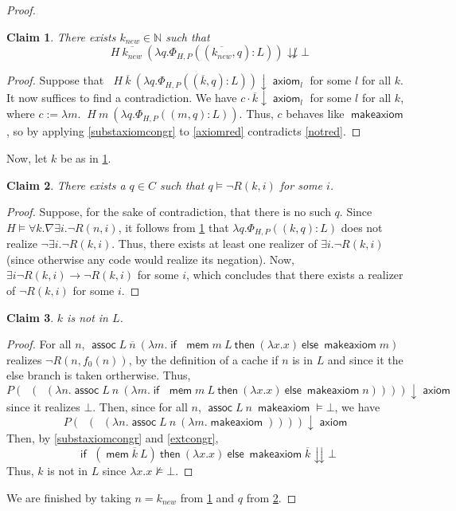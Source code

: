 \documentclass{article}
\newtheorem{claim}{Claim}
\DeclareMathOperator{\makeaxiom}{\mathsf{makeaxiom}}
\DeclareMathOperator{\axiom}{\mathsf{axiom}}
\DeclareMathOperator{\assoc}{\mathsf{assoc}}
\DeclareMathOperator{\mem}{\mathsf{mem}}
\DeclareMathOperator{\iif}{\mathsf{if}\ }
\newcommand{\tthen}{\mathbin{\ \mathsf{then}}\ }
\newcommand{\eelse}{\mathbin{\ \mathsf{else}}\ }
\DeclareMathOperator{\introexists}{\mathsf{intro}_\exists}
\DeclareMathOperator{\introforall}{\mathsf{intro}_\forall}
\DeclareMathOperator{\elimexists}{\mathsf{elim}_\exists}
\DeclareMathOperator{\elimforall}{\mathsf{elim}_\forall}
\newcommand{\N}{\mathbb{N}}
\begin{document}
\begin{proof}
    \begin{claim}\label{new}
        There exists $k_{new} \in \N$ such that
        \[ \elimforall H\ \overline{k_{new}}\ (\lambda q. \Phi_{H, P} ((\overline{k_{new}}, q):L)) \not\downdownarrows \bot \]
    \end{claim}
    \begin{proof}
        Suppose that $ \elimforall H\ \overline{k}\ (\lambda q. \Phi_{H, P} ((\overline{k}, q):L)) \downarrow \axiom_l$ for some $l$ for all $k$.
        It now suffices to find a contradiction.
        We have $c \cdot \overline{k} \downarrow \axiom_l$ for some $l$ for all $k$, where $c := \lambda m. \elimforall H\ m\ (\lambda q. \Phi_{H, P} ((m, q):L))$.
        Thus, $c$ behaves like $\makeaxiom$, so by applying \cref{substaxiomcongr} to \cref{axiomred} contradicts \cref{notred}.
    \end{proof}

    Now, let $k$ be as in \cref{new}.
    
    \begin{claim}\label{newrealizer}
        There exists a $q \in C$ such that $q \models \neg R(k, i)$ for some $i$.
    \end{claim}
    \begin{proof}
        Suppose, for the sake of contradiction, that there is no such $q$.
        Since $H \models \forall k. \nabla \exists i. \neg R(n, i)$, it follows from \cref{new} that $\lambda q. \Phi_{H, P} ((k, q):L)$ does not realize $\neg \exists i. \neg R(k, i)$.
        Thus, there exists at least one realizer of $\exists i. \neg R(k, i)$ (since otherwise any code would realize its negation).
        Now, $\exists i \neg R(k, i) \xrightarrow{\elimexists} \neg R(k, i)$ for some $i$, which concludes that there exists a realizer of $\neg R(k, i)$ for some $i$.
    \end{proof}

    \begin{claim}\label{newdifferent}
        $k$ is not in $L$.
    \end{claim}
    \begin{proof}
        For all $n$, $\assoc L\ \overline{n}\ (\lambda m. \iif \mem m\ L \tthen (\lambda x. x) \eelse \makeaxiom m)$ realizes $\neg R(n, f_0(n))$, by the definition of a cache if $n$ is in $L$ and since it the else branch is taken ortherwise.
        Thus, \[P (\introexists (\introforall (\lambda n. \assoc L\ n\ (\lambda m. \iif \mem m\ L \tthen (\lambda x. x) \eelse \makeaxiom n)))) \downarrow \axiom\]
        since it realizes $\bot$.
        Then, since for all $n$, $\assoc L\ n\ \makeaxiom \models \bot$, we have \[P (\introexists (\introforall (\lambda n. \assoc L\ n\ (\lambda m. \makeaxiom)))) \downarrow \axiom\]
        Then, by \cref{substaxiomcongr} and \cref{extcongr},
        \[\iif (\mem \overline{k}\ L) \tthen (\lambda x. x) \eelse \makeaxiom \overline{k} \downdownarrows \bot\]
        Thus, $k$ is not in $L$ since $\lambda x. x \not\models \bot$.
    \end{proof}

    We are finished by taking $n = k_{new}$ from \cref{new} and $q$ from \cref{newrealizer}.
\end{proof}
\end{document}
